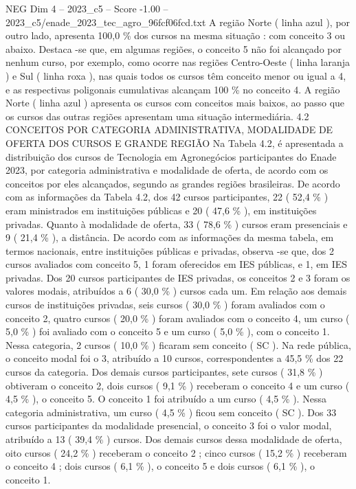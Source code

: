 \begin{textsample}{NEG Dim 4 – 2023\_c5 – Score -1.00 – 2023\_c5/enade\_2023\_tec\_agro\_96fcf06fcd.txt}
A região Norte ( linha azul ), por outro lado, apresenta 100,0 \% dos cursos na mesma situação : com conceito 3 ou abaixo.
Destaca -se que, em algumas regiões, o conceito 5 não foi alcançado por nenhum curso, por exemplo, como ocorre nas regiões Centro-Oeste ( linha laranja ) e Sul ( linha roxa ), nas quais todos os cursos têm conceito menor ou igual a 4, e as respectivas poligonais cumulativas alcançam 100 \% no conceito 4.
A região Norte ( linha azul ) apresenta os cursos com conceitos mais baixos, ao passo que os cursos das outras regiões apresentam uma situação intermediária. 4.2 CONCEITOS POR CATEGORIA ADMINISTRATIVA, MODALIDADE DE OFERTA DOS CURSOS E GRANDE REGIÃO Na Tabela 4.2, é apresentada a distribuição dos cursos de Tecnologia em Agronegócios participantes do Enade 2023, por categoria administrativa e modalidade de oferta, de acordo com os conceitos por eles alcançados, segundo as grandes regiões brasileiras.
De acordo com as informações da Tabela 4.2, dos 42 cursos participantes, 22 ( 52,4 \% ) eram ministrados em instituições públicas e 20 ( 47,6 \% ), em instituições privadas.
Quanto à modalidade de oferta, 33 ( 78,6 \% ) cursos eram presenciais e 9 ( 21,4 \% ), a distância.
De acordo com as informações da mesma tabela, em termos nacionais, entre instituições públicas e privadas, observa -se que, dos 2 cursos avaliados com conceito 5, 1 foram oferecidos em IES públicas, e 1, em IES privadas.
Dos 20 cursos participantes de IES privadas, os conceitos 2 e 3 foram os valores modais, atribuídos a 6 ( 30,0 \% ) cursos cada um.
Em relação aos demais cursos de instituições privadas, seis cursos ( 30,0 \% ) foram avaliados com o conceito 2, quatro cursos ( 20,0 \% ) foram avaliados com o conceito 4, um curso ( 5,0 \% ) foi avaliado com o conceito 5 e um curso ( 5,0 \% ), com o conceito 1.
Nessa categoria, 2 cursos ( 10,0 \% ) ficaram sem conceito ( SC ).
Na rede pública, o conceito modal foi o 3, atribuído a 10 cursos, correspondentes a 45,5 \% dos 22 cursos da categoria.
Dos demais cursos participantes, sete cursos ( 31,8 \% ) obtiveram o conceito 2, dois cursos ( 9,1 \% ) receberam o conceito 4 e um curso ( 4,5 \% ), o conceito 5.
O conceito 1 foi atribuído a um curso ( 4,5 \% ).
Nessa categoria administrativa, um curso ( 4,5 \% ) ficou sem conceito ( SC ).
Dos 33 cursos participantes da modalidade presencial, o conceito 3 foi o valor modal, atribuído a 13 ( 39,4 \% ) cursos.
Dos demais cursos dessa modalidade de oferta, oito cursos ( 24,2 \% ) receberam o conceito 2 ; cinco cursos ( 15,2 \% ) receberam o conceito 4 ; dois cursos ( 6,1 \% ), o conceito 5 e dois cursos ( 6,1 \% ), o conceito 1.

\end{textsample}

